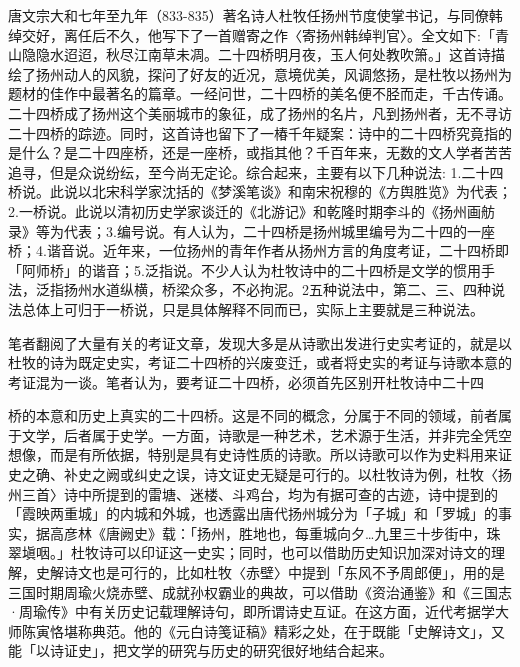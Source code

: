 唐文宗大和七年至九年（833-835）著名诗人杜牧任扬州节度使掌书记，与同僚韩绰交好，离任后不久，他写下了一首赠寄之作〈寄扬州韩绰判官〉。全文如下:「青山隐隐水迢迢，秋尽江南草未凋。二十四桥明月夜，玉人何处教吹箫。」这首诗描绘了扬州动人的风貌，探问了好友的近况，意境优美，风调悠扬，是杜牧以扬州为题材的佳作中最著名的篇章。一经问世，二十四桥的美名便不胫而走，千古传诵。二十四桥成了扬州这个美丽城市的象征，成了扬州的名片，凡到扬州者，无不寻访二十四桥的踪迹。同时，这首诗也留下了一椿千年疑案：诗中的二十四桥究竟指的是什么？是二十四座桥，还是一座桥，或指其他？千百年来，无数的文人学者苦苦追寻，但是众说纷纭，至今尚无定论。综合起来，主要有以下几种说法: 1.二十四桥说。此说以北宋科学家沈括的《梦溪笔谈》和南宋祝穆的《方舆胜览》为代表；2.一桥说。此说以清初历史学家谈迁的《北游记》和乾隆时期李斗的《扬州画舫录》等为代表；3.编号说。有人认为，二十四桥是扬州城里编号为二十四的一座桥；4.谐音说。近年来，一位扬州的青年作者从扬州方言的角度考证，二十四桥即「阿师桥」的谐音；5.泛指说。不少人认为杜牧诗中的二十四桥是文学的惯用手法，泛指扬州水道纵横，桥梁众多，不必拘泥。2五种说法中，第二、三、四种说法总体上可归于一桥说，只是具体解释不同而已，实际上主要就是三种说法。

笔者翻阅了大量有关的考证文章，发现大多是从诗歌出发进行史实考证的，就是以杜牧的诗为既定史实，考证二十四桥的兴废变迁，或者将史实的考证与诗歌本意的考证混为一谈。笔者认为，要考证二十四桥，必须首先区别开杜牧诗中二十四

\vfill
\begin{BookNotes}
\end{BookNotes}

\noindent 桥的本意和历史上真实的二十四桥。这是不同的概念，分属于不同的领域，前者属于文学，后者属于史学。一方面，诗歌是一种艺术，艺术源于生活，并非完全凭空想像，而是有所依据，特别是具有史诗性质的诗歌。所以诗歌可以作为史料用来证史之确、补史之阙或纠史之误，诗文证史无疑是可行的。以杜牧诗为例，杜牧〈扬州三首〉诗中所提到的雷塘、迷楼、斗鸡台，均为有据可查的古迹，诗中提到的「霞映两重城」的内城和外城，也透露出唐代扬州城分为「子城」和「罗城」的事实，据高彦林《唐阙史》载：「扬州，胜地也，每重城向夕…九里三十步街中，珠翠塡咽。」杜牧诗可以印证这一史实；同时，也可以借助历史知识加深对诗文的理解，史解诗文也是可行的，比如杜牧〈赤壁〉中提到「东风不予周郎便」，用的是三国时期周瑜火烧赤壁、成就孙权霸业的典故，可以借助《资治通鉴》和《三国志·周瑜传》中有关历史记载理解诗句，即所谓诗史互证。在这方面，近代考据学大师陈寅恪堪称典范。他的《元白诗笺证稿》精彩之处，在于既能「史解诗文」，又能「以诗证史」，把文学的研究与历史的研究很好地结合起来。

